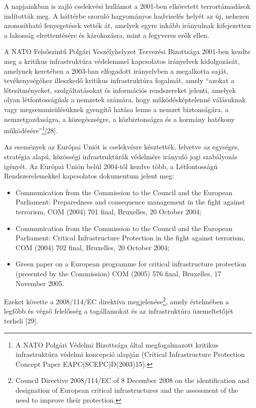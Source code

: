 \documentclass[12pt,magyar,a4paper,oneside]{scrreprt}
\providecommand{\tightlist}{%
  \setlength{\itemsep}{0pt}\setlength{\parskip}{0pt}}
\begin{document}
A napjainkban is zajló cselekvési hullámot a 2001-ben elkövetett
terrortámadások indították meg. A háttérbe szoruló hagyományos
hadviselés helyét az új, nehezen azonosítható fenyegetések vették át,
amelyek egyre inkább irányulnak kifejezetten a lakosság elrettentésére
és károkozásra, mint a fegyveres erők ellen.

A NATO Felsőszintű Polgári Veszélyhelyzet Tervezési Bizottsága 2001-ben
kezdte meg a kritikus infrastruktúra védelemmel kapcsolatos irányelvek
kidolgozását, amelynek keretében a 2003-ban elfogadott irányelvben a
megalkotta saját, tevékenységéhez illeszkedő kritikus infrastruktúra
fogalmát, amely ``azokat a létesítményeket, szolgáltatásokat és
információs rendszereket jelenti, amelyek olyan létfontosságúak a
nemzetek számára, hogy működésképtelenné válásuknak vagy
megsemmisülésüknek gyengítő hatása lenne a nemzet biztonságára, a
nemzetgazdaságra, a közegészségre, a közbiztonságra és a kormány
hatékony működésére''\footnote{A NATO Polgári Védelmi Bizottsága által
  megfogalmazott kritikus infrastruktúra védelmi koncepció alapján
  (Critical Infrastructure Protection Concept Paper
  EAPC(SCEPC)D(2003)15).}{[}28{]}.

Az események az Európai Uniót is cselekvésre késztették, felvetve az
egységes, stratégia alapú, közösségi infrastruktúrák védelmére irányuló
jogi szabályozás igényét. Az Európai Unión belül 2004-től kezdve több, a
Létfontosságú Rendszerelemekkel kapcsolatos dokumentum jelent meg:

\begin{itemize}
\tightlist
\item
  Communication from the Commission to the Council and the European
  Parliament: Preparedness and consequence management in the fight
  against terrorism, COM (2004) 701 final, Bruxelles, 20 October 2004;
\item
  Communication from the Commission to the Council and the European
  Parliament: Critical Infrastructure Protection in the fight against
  terrorism, COM (2004) 702 final, Bruxelles, 20 October 2004;
\item
  Green paper on a European programme for critical infrastructure
  protection (presented by the Commission) COM (2005) 576 final,
  Bruxelles, 17 November 2005.
\end{itemize}

Ezeket követte a 2008/114/EC direktíva megjelenése\footnote{Council
  Directive 2008/114/EC of 8 December 2008 on the identification and
  designation of European critical infrastructures and the assessment of
  the need to improve their protection.}, amely értelmében a legfőbb és
végső felelősség a tagállamokat és az infrastruktúra üzemeltetőjét
terheli {[}29{]}.
\end{document}
